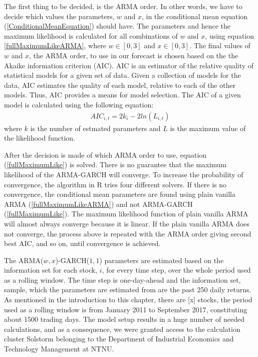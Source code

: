 The first thing to be decided, is the ARMA order. In other words, we have to decide which values the parameters, $w$ and $x$, in the conditional mean equation (\ref{ConditionalMeanEquation}) should have. The parameters and hence the maximum likelihood is calculated for all combinations of $w$ and $x$, using equation \ref{fullMaximumLikeARMA}, where $w\in[0,3]$ and $x\in[0,3]$. The final values of $w$ and $x$, the ARMA order, to use in our forecast is chosen based on the the Akaike information criterion (AIC). AIC is an estimator of the relative quality of statistical models for a given set of data. Given a collection of models for the data, AIC estimates the quality of each model, relative to each of the other models. Thus, AIC provides a means for model selection. The AIC of a given model is calculated using the following equation:
\begin{align}
    AIC_{i,t}=2k_i-2ln(L_{i,t})
\end{align}
where $k$ is the number of estmated parameters and $L$ is the maximum value of the likelihood function. 

After the decision is made of which ARMA order to use, equation (\ref{fullMaximumLike}) is solved. There is no guarantee that the maximum likelihood of the ARMA-GARCH will converge. To increase the probability of convergence, the algorithm in R tries four different solvers. If there is no convergence, the conditional mean parameters are found using plain vanilla ARMA (\ref{fullMaximumLikeARMA}) and not ARMA-GARCH (\ref{fullMaximumLike}). The maximum likelihood function of plain vanilla ARMA will almost always converge because it is linear. If the plain vanilla ARMA does not converge, the process above is repeated with the ARMA order giving second best AIC, and so on, until convergence is achieved.

The ARMA($w,x$)-GARCH($1,1$) parameters are estimated based on the information set for each stock, $i$, for every time step, over the whole period used as a rolling window. The time step is one-day-ahead and the information set, sample, which the parameters are estimated from are the past 250 daily returns. As mentioned in the introduction to this chapter, there are [x] stocks, the period used as a rolling window is from January 2011 to September 2017, constituting about 1500 trading days. The model setup results in a huge number of needed calculations, and as a consequence, we were granted access to the calculation cluster Solstorm belonging to the Department of Industrial Economics and Technology Management at NTNU. 

